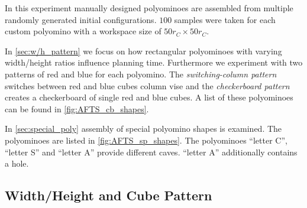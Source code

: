 
In this experiment manually designed polyominoes are assembled from multiple randomly generated initial configurations.
$100$ samples were taken for each custom polyomino with a workspace size of $50 r_C \times 50 r_C$.

In \autoref{sec:w/h_pattern} we focus on how rectangular polyominoes with varying width/height ratios influence planning time.
Furthermore we experiment with two patterns of red and blue for each polyomino.
The \textit{switching-column pattern} switches between red and blue cubes column vise and the \textit{checkerboard pattern} creates a checkerboard of single red and blue cubes.
A list of these polyominoes can be found in \autoref{fig:AFTS_cb_shapes}.

In \autoref{sec:special_poly} assembly of special polyomino shapes is examined. 
The polyominoes are listed in \autoref{fig:AFTS_sp_shapes}.
The polyominoes ``letter C'', ``letter S'' and ``letter A'' provide different caves.
``letter A'' additionally contains a hole. 

\subsection{Width/Height and Cube Pattern}
\label{sec:w/h_pattern}

